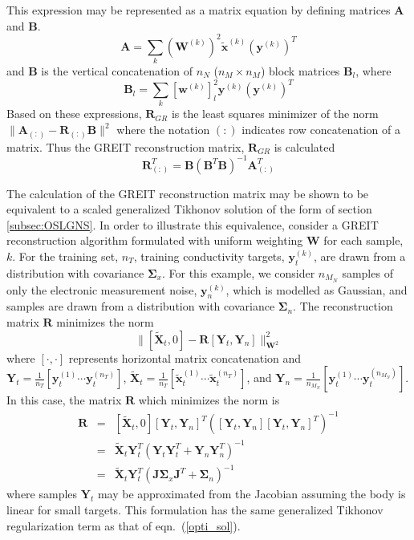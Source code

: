 \documentclass[12pt]{iopart}
\newcommand{\xT}{\mbox{$\mathbf{\tilde x}$}}
\newcommand{\XT}{\mbox{$\mathbf{\tilde X}$}}
\newcommand{\yB}{\mbox{$\mathbf{y}$}}
\newcommand{\wB}{\mbox{$\mathbf{w}$}}
\newcommand{\AB}{\mbox{$\mathbf{A}$}}
\newcommand{\BB}{\mbox{$\mathbf{B}$}}
\newcommand{\RB}{\mbox{$\mathbf{R}$}}
\newcommand{\JB}{\mbox{$\mathbf{J}$}}
\newcommand{\WB}{\mbox{$\mathbf{W}$}}
\newcommand{\YB}{\mbox{$\mathbf{Y}$}}
\newcommand{\SG}{\mbox{${\boldsymbol \Sigma}$}}
\begin{document}
This expression may be represented as a matrix equation
by defining matrices $\AB$ and $\BB$.
\begin{equation}
\AB = \sum_k (\WB^{(k)})^2 \xT^{(k)} (\yB^{(k)})^T 
\end{equation}
and $\BB$ is the vertical concatenation of $n_N$
($n_M \times n_M$) block matrices $\BB_l$, where
\begin{equation}
\BB_l = \sum_k [\wB^{(k)}]_l^2 \yB^{(k)} (\yB^{(k)})^T 
\end{equation}
Based on these expressions, $\RB_{GR}$ is the
least squares minimizer of the norm 
$\|\AB_{(:)} - \RB_{(:)} \BB\|^2$ where
the notation $(:)$ indicates row concatenation of a matrix.
Thus the GREIT reconstruction matrix, $\RB_{GR}$
is calculated
\begin{equation}
\RB_{(:)}^T = \BB (\BB^T \BB)^{-1} \AB_{(:)}^T
\end{equation}

The calculation of the GREIT reconstruction matrix
may be shown to be equivalent to a scaled generalized
Tikhonov solution of the form of section \ref{subsec:OSLGNS}.
In order to illustrate this equivalence, consider
a GREIT reconstruction algorithm formulated
with uniform weighting $\WB$ for each sample, $k$. For the training set,
$n_T$, training conductivity targets, $\yB_t^{(k)}$, are drawn from
a distribution with covariance $\SG_x$.
For this example, we consider $n_{M_N}$ samples of only the electronic
measurement noise, $\yB_n^{(k)}$, which is modelled as Gaussian,
and samples are drawn from a distribution with 
covariance $\SG_n$. The reconstruction matrix $\RB$ minimizes
the norm
\begin{equation}
\| [ \XT_t, 0 ] - \RB [ \YB_t, \YB_n ] \|_{\WB^2}^2
\end{equation}
where $[\cdot,\cdot]$ represents horizontal
matrix concatenation and
$\YB_t = \frac{1}{n_T}    [ \yB_t^{(1)} \cdots \yB_t^{(n_T)} ]$,
$\XT_t = \frac{1}{n_T}    [ \xT_t^{(1)} \cdots \xT_t^{(n_T)} ]$,
and 
$\YB_n = \frac{1}{n_{M_N}} [ \yB_t^{(1)} \cdots \yB_t^{(n_{M_N})} ]$.
In this case, the matrix $\RB$ which minimizes the norm is 
\begin{eqnarray}
\RB &=& [ \XT_t, 0 ] [\YB_t, \YB_n]^T
     \left( [\YB_t, \YB_n] [\YB_t, \YB_n]^T \right)^{-1}
\nonumber \\
    &=& \XT_t \YB_t^T \left( \YB_t \YB_t^T + \YB_n \YB_n^T \right)^{-1}
\nonumber \\
    &=& \XT_t \YB_t^T \left( \JB \SG_x \JB^T + \SG_n \right)^{-1}
\end{eqnarray}
where samples $\YB_t$ may be approximated from the Jacobian
assuming the body is linear for small targets. This formulation 
has the same generalized Tikhonov regularization 
term as that 
of eqn.\ (\ref{opti_sol}).
\end{document}
